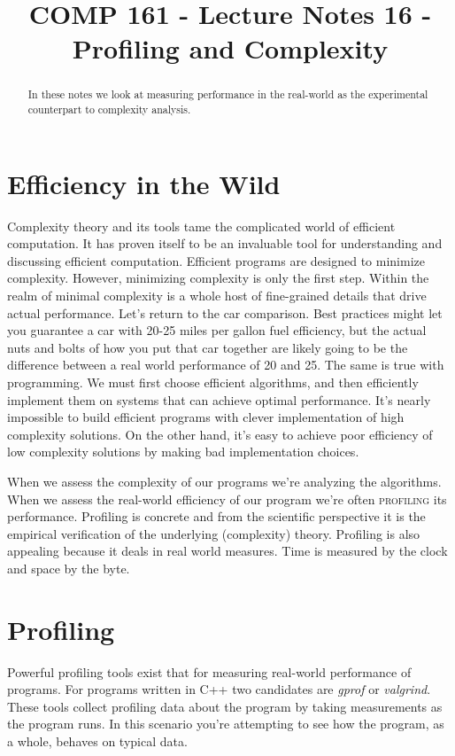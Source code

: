 \documentclass[]{tufte-handout}
\title{COMP 161 - Lecture Notes 16 - Profiling and Complexity}
\date{}
\begin{document}
 
\maketitle

\begin{abstract}
In these notes we look at measuring performance in the real-world as the experimental counterpart to complexity analysis.
\end{abstract}


\section{Efficiency in the Wild}

Complexity theory and its tools tame the complicated world of efficient computation. It has proven itself to be an invaluable tool for understanding and discussing efficient computation. Efficient programs are designed to minimize complexity.  However, minimizing complexity is only the first step.  Within the realm of minimal complexity is a whole host of fine-grained details that drive actual performance. Let's return to the car comparison. Best practices might let you guarantee a car with 20-25 miles per gallon fuel efficiency, but the actual nuts and bolts of how you put that car together are likely going to be the difference between a real world performance of 20 and 25. The same is true with programming. We must first choose efficient algorithms, and then efficiently implement them on systems that can achieve optimal performance. It's nearly impossible to build efficient programs with clever implementation of high complexity solutions. On the other hand, it's easy to achieve poor efficiency of low complexity solutions by making bad implementation choices. 

When we assess the complexity of our programs we're analyzing the algorithms. When we assess the real-world efficiency of our program we're often \textsc{profiling} its performance. Profiling is concrete and from the scientific perspective it is the empirical verification of the underlying (complexity) theory. Profiling is also appealing because it deals in real world measures. Time is measured by the clock and space by the byte. 

\section{Profiling}

Powerful profiling tools exist that for measuring real-world performance of programs. For programs written in C++ two candidates are \textit{gprof} or \textit{valgrind}. These tools collect profiling data about the program by taking measurements as the program runs.  In this scenario you're attempting to see how the program, as a whole, behaves on typical data. 
\end{document}
